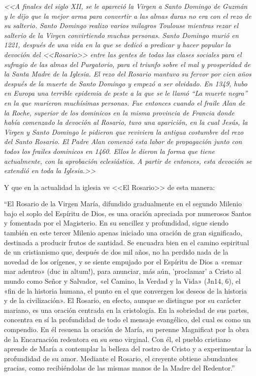 \documentclass[12pt, letterpaper]{report}
\begin{document}
    \Large \textit{<<A finales del siglo XII, se le apareció la Virgen a Santo Domingo de Guzmán y le dijo que la mejor arma para convertir a las almas duras no era con el rezo de su salterio. Santo Domingo realizo varios milagros Toulouse mientras rezar el salterio de la Virgen convirtiendo muchas personas. Santo Domingo murió en 1221, después de una vida en la que se dedicó a predicar y hacer popular la devoción del <<Rosario>> entre las gentes de todas las clases sociales para el sufragio de las almas del Purgatorio, para el triunfo sobre el mal y prosperidad de la Santa Madre de la Iglesia. El rezo del Rosario mantuvo su fervor por cien años después de la muerte de Santo Domingo y empezó a ser olvidado. En 1349, hubo en Europa una terrible epidemia de peste a la que se le llamó ``La muerte negra'' en la que murieron muchísimas personas. Fue entonces cuando el fraile Alan de la Roche, superior de los dominicos en la misma provincia de Francia donde había comenzado la devoción al Rosario, tuvo una aparición, en la cual Jesús, la Virgen y Santo Domingo le pidieron que reviviera la antigua costumbre del rezo del Santo Rosario. El Padre Alan comenzó esta labor de propagación junto con todos los frailes dominicos en 1460. Ellos le dieron la forma que tiene actualmente, con la aprobación eclesiástica. A partir de entonces, esta devoción se extendió en toda la Iglesia.>>}\cite{RorasioCatholicNet}
    
    \Large Y que en la actualidad la iglesia ve <<El Rosario>> de esta manera:
    
    \Large ``El Rosario de la Virgen María, difundido gradualmente en el segundo Milenio bajo el soplo del Espíritu de Dios, es una oración apreciada por numerosos Santos y fomentada por el Magisterio. En su sencillez y profundidad, sigue siendo también en este tercer Milenio apenas iniciado una oración de gran significado, destinada a producir frutos de santidad. Se encuadra bien en el camino espiritual de un cristianismo que, después de dos mil años, no ha perdido nada de la novedad de los orígenes, y se siente empujado por el Espíritu de Dios a «remar mar adentro» (duc in altum!), para anunciar, más aún, 'proclamar' a Cristo al mundo como Señor y Salvador, «el Camino, la Verdad y la Vida» (Jn14, 6), el «fin de la historia humana, el punto en el que convergen los deseos de la historia y de la civilización». El Rosario, en efecto, aunque se distingue por su carácter mariano, es una oración centrada en la cristología. En la sobriedad de sus partes, concentra en sí la profundidad de todo el mensaje evangélico, del cual es como un compendio. En él resuena la oración de María, su perenne Magnificat por la obra de la Encarnación redentora en su seno virginal. Con él, el pueblo cristiano aprende de María a contemplar la belleza del rostro de Cristo y a experimentar la profundidad de su amor. Mediante el Rosario, el creyente obtiene abundantes gracias, como recibiéndolas de las mismas manos de la Madre del Redentor.''\cite{Enciclica}
    
\end{document}
